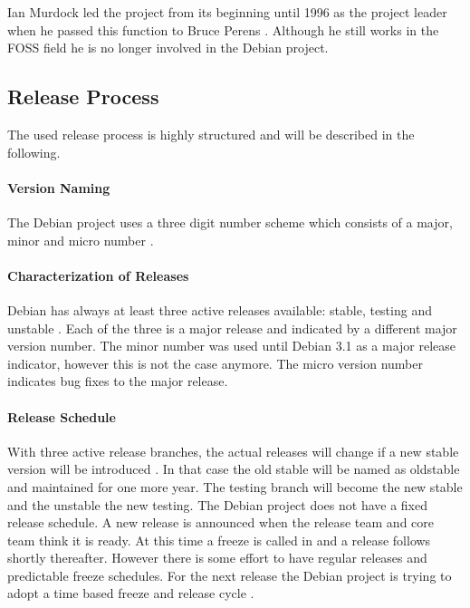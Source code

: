 Ian Murdock led the project from its beginning until 1996 as the project
leader when he passed this function to Bruce Perens
\cite{DebianFAQ,DebianHistory}. Although he still works in the \ac{FOSS} field
he is no longer involved in the Debian project.

\subsection{Release Process}

The used release process is highly structured and will be described in the
following.

\paragraph{Version Naming}

The Debian project uses a three digit number scheme which consists of a major,
minor and micro number \cite{DebianReleases}.

\paragraph{Characterization of Releases}

Debian has always at least three active releases available: stable, testing and
unstable \cite{DebianReleases,DebianReleaseManagement}. Each of the three is a
major release and indicated by a different major version number. The minor
number was used until Debian 3.1 as a major release indicator, however this is
not the case anymore. The micro version number indicates bug fixes to the major
release.

\paragraph{Release Schedule}

With three active release branches, the actual releases will change if a new
stable version will be introduced
\cite{McGovern2011,DebianReleaseManagement,DebianReleaseGoals}. In that case
the old stable will be named as oldstable and maintained for one more year. The
testing branch will become the new stable and the unstable the new testing. The
Debian project does not have a fixed release schedule. A new release is
announced when the release team and core team think it is ready. At this time a
freeze is called in and a release follows shortly thereafter. However there is
some effort to have regular releases and predictable freeze schedules. For the
next release the Debian project is trying to adopt a time based freeze and
release cycle \cite{McGovern2011}.

